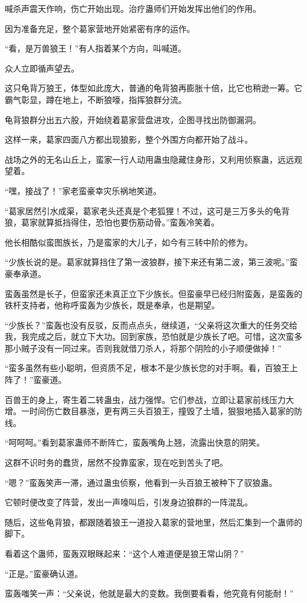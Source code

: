 \begin{this_body}
喊杀声震天作响，伤亡开始出现。治疗蛊师们开始发挥出他们的作用。

因为准备充足，整个葛家营地开始紧密有序的运作。

“看，是万兽狼王！”有人指着某个方向，叫喊道。

众人立即循声望去。

这只龟背万狼王，体型如此庞大，普通的龟背狼再膨胀十倍，比它也稍逊一筹。它霸气彰显，蹲在地上，不断狼嚎，指挥狼群分流。

龟背狼群分出五六股，开始绕着葛家营盘进攻，企图寻找出防御漏洞。

这样一来，葛家四面八方都出现狼影，整个外围方向都开始了战斗。

战场之外的无名山丘上，蛮家一行人动用蛊虫隐藏住身形，又利用侦察蛊，远远观望着。

“嘿，接战了！”家老蛮豪幸灾乐祸地笑道。

“葛家居然引水成渠，葛家老头还真是个老狐狸！不过，这可是三万多头的龟背狼，葛家就算抵挡得住，恐怕也要伤筋动骨。”蛮轰冷笑着。

他长相酷似蛮图族长，乃是蛮家的大儿子，如今有三转中阶的修为。

“少族长说的是。葛家就算挡住了第一波狼群，接下来还有第二波，第三波呢。”蛮豪奉承道。

蛮轰虽然是长子，但蛮家还未真正立下少族长。但蛮豪早已经归附蛮轰，是蛮轰的铁杆支持者，他称呼蛮轰为少族长，既是奉承，也是期望。

“少族长？”蛮轰也没有反驳，反而点点头，继续道，“父亲将这次重大的任务交给我，我完成之后，就立下大功。回到家族，恐怕就是少族长了吧。可惜，这次蛮多那小贼子没有一同过来。否则我就借刀杀人，将那个阴险的小子顺便做掉！”

“蛮多虽然有些小聪明，但资质不足，根本不是少族长您的对手啊。看，百狼王上阵了！”蛮豪道。

百兽王的身上，寄生着二转蛊虫，战力强悍。它们参战，立即让葛家前线压力大增。一时间伤亡数目暴涨，更有两三头百狼王，撞毁了土墙，狠狠地插入葛家的防线。

“呵呵呵。”看到葛家蛊师不断阵亡，蛮轰嘴角上翘，流露出快意的阴笑。

这群不识时务的蠢货，居然不投靠蛮家，现在吃到苦头了吧。

“嗯？”蛮轰笑声一滞，通过蛊虫侦察，他看到一头百狼王被种下了驭狼蛊。

它顿时便改变了阵营，发出一声嚎叫后，引发身边狼群的一阵混乱。

随后，这些龟背狼，都跟随着狼王一道投入葛家的营地里，然后汇集到一个蛊师的脚下。

看着这个蛊师，蛮轰双眼眯起来：“这个人难道便是狼王常山阴？”

“正是。”蛮豪确认道。

蛮轰嗤笑一声：“父亲说，他就是最大的变数。我倒要看看，他究竟有何能耐！”

\end{this_body}

